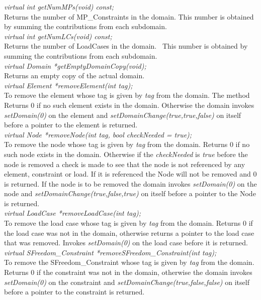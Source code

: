 {\em virtual int getNumMPs(void) const;}\\
Returns the number of MP\_Constraints in the domain. 
This number is obtained by summing the contributions from each subdomain. \\

{\em virtual int getNumLCs(void) const;}\\    
Returns the number of LoadCases in the domain. \
This number is obtained by summing the contributions from each subdomain. \\

{\em virtual Domain *getEmptyDomainCopy(void);}\\
Returns an empty copy of the actual domain.\\

{\em virtual Element *removeElement(int tag);}\\
To remove the element whose tag is given by {\em tag} from the
domain. The method Returns $0$ if no such element exists in the domain. Otherwise 
the domain invokes {\em setDomain(0)} on the element and {\em
setDomainChange(true,true,false)} on itself before a pointer to the
element is returned. \\

{\em virtual Node *removeNode(int tag, bool checkNeeded = true);}\\    
To remove the node whose tag is given by {\em tag} from the domain. 
Returns $0$ if no such node exists in the domain. Otherwise
if the {\em checkNeeded} is {\em true} before the node is removed a
check is made to see that the node is not referenced by any element,
constraint or load. If it is referenced the Node will not be
removed and $0$ is returned. If the node is to be removed the domain
invokes {\em setDomain(0)} on the node and {\em
setDomainChange(true,false,true)} on itself before a pointer to the
Node is returned.\\

{\em virtual LoadCase *removeLoadCase(int tag);}\\        
To remove the load case whose tag is given by {\em tag} from the domain. 
Returns $0$ if the load case was not in the domain, otherwise
returns a pointer to the load case that was removed. Invokes {\em
setDomain(0)} on the load case before it is returned.\\

{\em virtual SFreedom\_Constraint *removeSFreedom\_Constraint(int tag);}\\
To remove the SFreedom\_Constraint whose tag is given by {\em tag} from the
domain. Returns $0$ if the constraint was not in the domain, otherwise
the domain invokes {\em setDomain(0)} on the constraint and {\em
setDomainChange(true,false,false)} on itself before a pointer to the
constraint is returned.\\  

